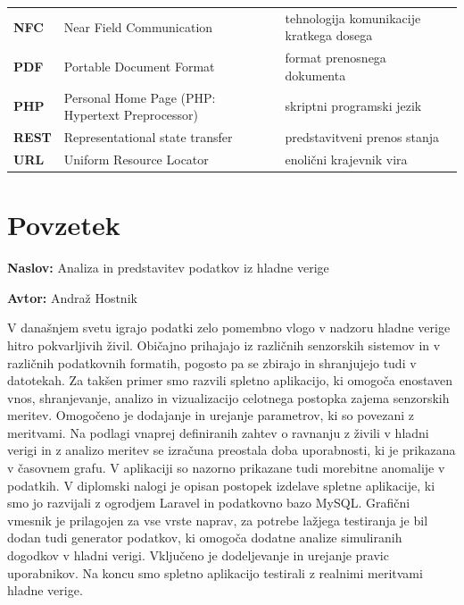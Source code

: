 \documentclass[a4paper, 12pt]{book}
\newcommand{\ttitle}{Analiza in predstavitev podatkov iz hladne verige}
\newcommand{\tauthor}{Andraž Hostnik}
\newcommand{\clearemptydoublepage}{\newpage{\pagestyle{empty}\cleardoublepage}}
\begin{document}
\begin{tabular}{p{}|p{}|p{}}
  {\bf NFC} & Near Field Communication & tehnologija komunikacije kratkega dosega \\
  {\bf PDF} & Portable Document Format & format prenosnega dokumenta \\
  {\bf PHP} & Personal Home Page (PHP: Hypertext Preprocessor) & skriptni programski jezik \\
  {\bf REST} & Representational state transfer & predstavitveni prenos stanja \\
  {\bf URL} & Uniform Resource Locator & enolični krajevnik vira \\
\end{tabular}


\clearemptydoublepage

\chapter*{Povzetek}

\noindent\textbf{Naslov:} \ttitle
\bigskip

\noindent\textbf{Avtor:} \tauthor
\bigskip

\noindent
V današnjem svetu igrajo podatki zelo pomembno vlogo v nadzoru hladne verige hitro pokvarljivih živil. Običajno prihajajo iz različnih senzorskih sistemov in v različnih podatkovnih formatih, pogosto pa se zbirajo in shranjujejo tudi v datotekah. Za takšen primer smo razvili spletno aplikacijo, ki omogoča enostaven vnos, shranjevanje, analizo in vizualizacijo celotnega postopka zajema senzorskih meritev.  Omogočeno je dodajanje in urejanje parametrov, ki so povezani z meritvami. Na podlagi vnaprej definiranih zahtev o ravnanju z živili v hladni verigi in z analizo meritev se izračuna preostala doba uporabnosti, ki je prikazana v časovnem grafu. V aplikaciji so nazorno prikazane tudi morebitne anomalije v podatkih. V diplomski nalogi je opisan postopek izdelave spletne aplikacije, ki smo jo razvijali z ogrodjem Laravel in podatkovno bazo MySQL. Grafični vmesnik je prilagojen za vse vrste naprav, za potrebe lažjega testiranja je bil dodan tudi generator podatkov, ki omogoča dodatne analize simuliranih dogodkov v hladni verigi. Vključeno je dodeljevanje in urejanje pravic uporabnikov. Na koncu smo spletno aplikacijo testirali z realnimi meritvami hladne verige.
\bigskip
\end{document}
